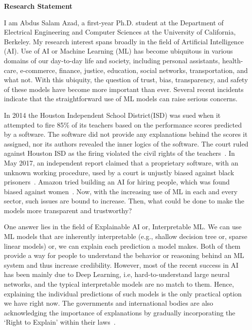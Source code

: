 \documentclass[12pt]{article}
\begin{document}


\fancyhf{}
\rfoot{\thepage}

\begin{center}
{\LARGE \bf 
Research Statement}\\
\end{center}
I am Abdus Salam Azad, a first-year Ph.D. student at the Department of Electrical Engineering and Computer Sciences at the University of California, Berkeley. My research interest spans broadly in the field of Artificial Intelligence (AI). Use of AI or Machine Learning (ML) has become ubiquitous in various domains of our day-to-day life and society, including personal assistants, health-care, e-commerce, finance, justice, education, social networks, transportation, and what not. With this ubiquity, the question of trust, bias, transparency, and safety of these models have become more important than ever. Several recent incidents indicate that the straightforward use of ML models can raise serious concerns.   

In 2014 the Houston Independent School District(ISD) was sued when it attempted to fire 85\% of its teachers based on the performance scores predicted by a software. The software did not provide any explanations behind the scores it assigned, nor its authors revealed the inner logics of the software. The court ruled against Houston ISD as the firing violated the civil rights of the teachers~\cite{evaas}. In May 2017, an independent report claimed that a proprietary software, with an unknown working procedure, used by a court is unjustly biased against black prisoners~\cite{compas}. Amazon tried building an AI for hiring people, which was found biased against women~\cite{amazon}. Now, with the increasing use of ML in each and every sector, such issues are bound to increase. Then, what could be done to make the models more transparent and trustworthy? 

One answer lies in the field of Explainable AI or, Interpretable ML. We can use ML models that are inherently interpretable (e.g., shallow decision tree or, sparse linear models) or, we can explain each prediction a model makes. Both of them provide a way for people to understand the behavior or reasoning behind an ML system and thus increase credibility. However, most of the recent success in AI has been mainly due to Deep Learning, i.e, hard-to-understand large neural networks, and the typical interpretable models are no match to them. Hence, explaining the individual predictions of such models is the only practical option we have right now.  The governments and international bodies are also acknowledging the importance of explanations by gradually incorporating the `Right to Explain’ within their laws~\cite{rte}. 
\end{document}
